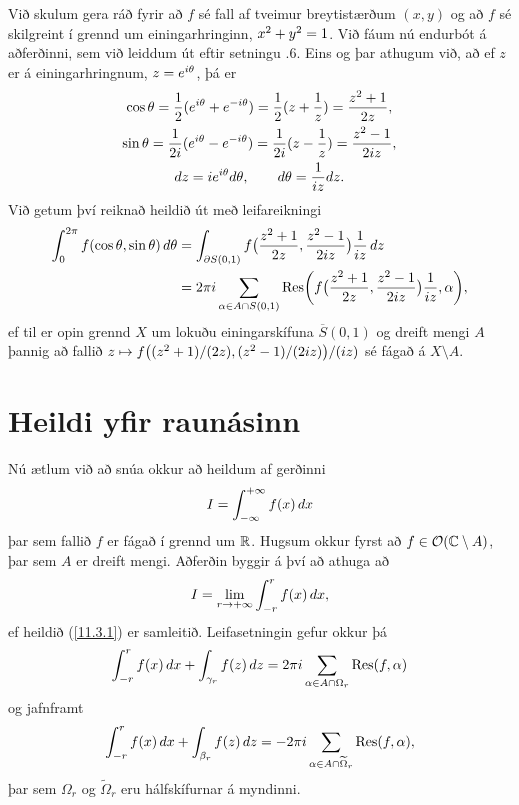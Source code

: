 \noindent
Við skulum gera ráð fyrir að $f$ sé fall af
tveimur breytistærðum $(x,y)$ og að $f$ sé skilgreint í grennd um
einingarhringinn, $x\sp 2+y\sp 2=1$.  Við fáum nú endurbót á
aðferðinni, sem við leiddum út eftir setningu .6.  Eins og þar
athugum við, að ef $z$ er á einingarhringnum, $z=e\sp{i\theta}$, þá
er 
\begin{gather*}
\cos\theta=\dfrac 12(e\sp{i\theta}+e\sp{-i\theta})
=\dfrac12(z+\dfrac 1z)=\dfrac{z\sp 2+1}{2z},\\ 
\sin\theta=\dfrac 1{2i}(e\sp{i\theta}-e\sp{-i\theta})
=\dfrac1{2i}(z-\dfrac 1z)=\dfrac{z\sp 2-1}{2iz},\\ 
dz=ie\sp{i\theta}d\theta, \qquad d\theta=\dfrac 1{iz}dz.
\end{gather*}
Við getum því reiknað  heildið út með leifareikningi
\begin{align*}
\int_0\sp {2\pi}f(\cos\theta,\sin
\theta)\, d\theta &=
\int_{\partial S(0,1)}f\big(\dfrac{z\sp 2+1}{2z},\dfrac{z\sp 2-1}{2iz}\big)
\dfrac 1{iz}\, dz\\
&=2\pi i \sum_{\alpha\in A\cap S(0,1)} {\operatorname{Res}}\bigg(
f\big(\dfrac{z\sp 2+1}{2z},\dfrac{z\sp 2-1}{2iz}\big)\dfrac 1{iz},\alpha
\bigg),
\end{align*}
ef til er opin grennd $X$ um lokuðu einingarskífuna $\overline S(0,1)$
og dreift mengi $A$ þannig að fallið $z\mapsto f\big({(z\sp
2+1)}/{(2z)},{(z\sp 2-1)}/{(2iz)}\big)/(iz)$ sé fágað á $X\setminus
A$. 



\section{Heildi yfir raunásinn}

\noindent
Nú ætlum við að snúa okkur að heildum af gerðinni
 \begin{equation*}I=\int_{-\infty}\sp{+\infty}f(x) \, dx \label{11.3.1}
 \end{equation*}
þar sem fallið $f$ er fágað í grennd um ${\mathbb R}$.
Hugsum okkur fyrst að $f\in {\cal O}({\mathbb C}\setminus A)$, þar sem $A$ er dreift
mengi. Aðferðin  byggir á því að athuga að 
 $$I=\lim_{r\to +\infty}\int_{-r}\sp r f(x)\, dx,
 $$
ef heildið (\ref{11.3.1}) er samleitið.
Leifasetningin gefur okkur þá
 $$\int_{-r}\sp{r}f(x)\, dx +\int_{\gamma_r}f(z)\, dz =
2\pi i\sum_{\alpha\in A\cap \Omega_r}{\operatorname{Res}}(f,\alpha)
 $$
og jafnframt 
 $$\int_{-r}\sp{r}f(x)\, dx +\int_{\beta_r}f(z)\, dz =
-2\pi i\sum_{\alpha\in A\cap \widetilde\Omega_r}{\operatorname{Res}}(f,\alpha),
 $$
þar sem $\Omega_r$ og $\widetilde\Omega_r$ eru hálfskífurnar á
myndinni.

